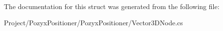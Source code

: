 The documentation for this struct was generated from the following file\+:\begin{DoxyCompactItemize}
\item 
Project/\+Pozyx\+Positioner/\+Pozyx\+Positioner/Vector3\+D\+Node.\+cs\end{DoxyCompactItemize}

